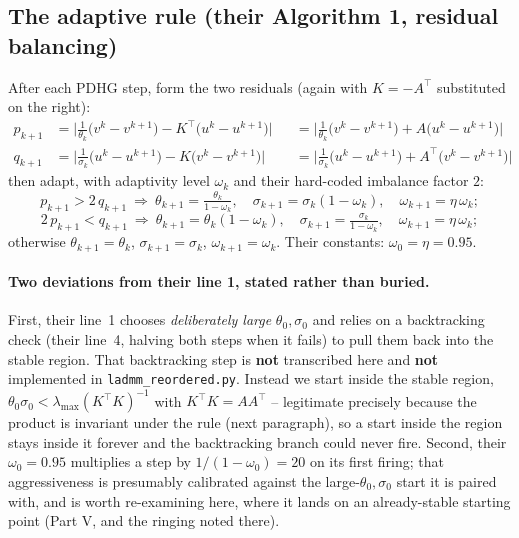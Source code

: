 \documentclass[11pt]{article}
\newcommand{\code}[1]{\texttt{#1}}
\begin{document}
\subsection*{The adaptive rule (their Algorithm 1, residual balancing)}
After each PDHG step, form the two residuals (again with $K=-A^\top$
substituted on the right):
\begin{align}
p_{k+1} &= \Big|\tfrac1{\theta_k}\big(v^k-v^{k+1}\big)-K^\top\big(u^k-u^{k+1}\big)\Big|
 &&= \Big|\tfrac1{\theta_k}\big(v^k-v^{k+1}\big)+A\big(u^k-u^{k+1}\big)\Big| \label{eq:p}\\
q_{k+1} &= \Big|\tfrac1{\sigma_k}\big(u^k-u^{k+1}\big)-K\big(v^k-v^{k+1}\big)\Big|
 &&= \Big|\tfrac1{\sigma_k}\big(u^k-u^{k+1}\big)+A^\top\big(v^k-v^{k+1}\big)\Big| \label{eq:q}
\end{align}
then adapt, with adaptivity level $\omega_k$ and their hard-coded imbalance
factor $2$:
\[
p_{k+1}>2\,q_{k+1}\ \Rightarrow\
\theta_{k+1}=\tfrac{\theta_k}{1-\omega_k},\quad \sigma_{k+1}=\sigma_k(1-\omega_k),\quad \omega_{k+1}=\eta\,\omega_k;
\]
\[
2\,p_{k+1}<q_{k+1}\ \Rightarrow\
\theta_{k+1}=\theta_k(1-\omega_k),\quad \sigma_{k+1}=\tfrac{\sigma_k}{1-\omega_k},\quad \omega_{k+1}=\eta\,\omega_k;
\]
otherwise $\theta_{k+1}=\theta_k$, $\sigma_{k+1}=\sigma_k$, $\omega_{k+1}=\omega_k$.
Their constants: $\omega_0=\eta=0.95$.

\paragraph{Two deviations from their line 1, stated rather than buried.}
First, their line~1 chooses \emph{deliberately large} $\theta_0,\sigma_0$ and
relies on a backtracking check (their line~4, halving both steps when it fails)
to pull them back into the stable region. That backtracking step is \textbf{not}
transcribed here and \textbf{not} implemented in \code{ladmm\_reordered.py}.
Instead we start inside the stable region, $\theta_0\sigma_0<\lambda_{\max}(K^\top
K)^{-1}$ with $K^\top K=AA^\top$ -- legitimate precisely because the product is
invariant under the rule (next paragraph), so a start inside the region stays
inside it forever and the backtracking branch could never fire. Second, their
$\omega_0=0.95$ multiplies a step by $1/(1-\omega_0)=20$ on its first firing;
that aggressiveness is presumably calibrated against the large-$\theta_0,\sigma_0$
start it is paired with, and is worth re-examining here, where it lands on an
already-stable starting point (Part V, and the ringing noted there).
\end{document}
